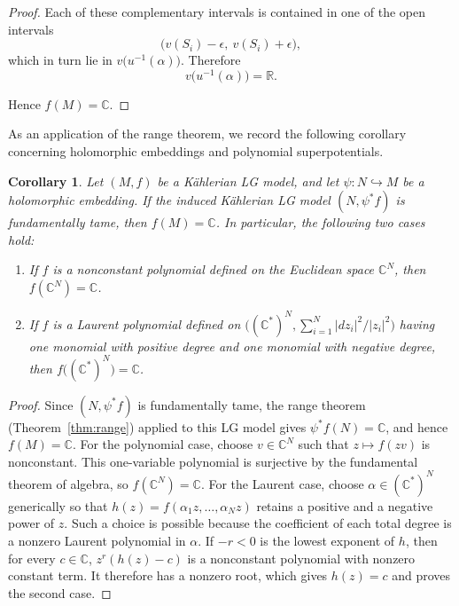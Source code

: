 \documentclass[11pt]{amsart}
\theoremstyle{plain}
\newtheorem{corollary}[theorem]{Corollary}
\theoremstyle{definition}
\theoremstyle{remark}
\numberwithin{equation}{section}
\begin{document}
\begin{proof}
    Each of these complementary intervals is contained in one of the open intervals
    \begin{equation}
        \bigl(v(S_i) - \epsilon, \ v(S_i) + \epsilon\bigr),
    \end{equation}
    which in turn lie in $v\bigl(u^{-1}(\alpha)\bigr)$.
    Therefore
    \begin{equation}
        v\bigl(u^{-1}(\alpha)\bigr) = \mathbb{R}.
    \end{equation}

    Hence $f(M) = \mathbb{C}$.
\end{proof}

As an application of the range theorem, we record the following corollary concerning holomorphic embeddings and polynomial superpotentials.

\begin{corollary}\label{cor:embedding}
    Let $(M,f)$ be a K\"ahlerian LG model, and let $\psi: N\hookrightarrow M$ be a holomorphic embedding.
    If the induced K\"ahlerian LG model $(N, \psi^* f)$ is fundamentally tame, then $f(M)=\mathbb{C}$.
    In particular, the following two cases hold:
    \begin{enumerate}
        \item If $f$ is a nonconstant polynomial defined on the Euclidean space $\mathbb{C}^N$, then $f(\mathbb{C}^N)=\mathbb{C}$.
        \item If $f$ is a Laurent polynomial defined on $\bigl((\mathbb{C}^*)^N, \sum_{i=1}^N |dz_i|^2/|z_i|^2\bigr)$ having one monomial with positive degree and one monomial with negative degree, then $f\bigl((\mathbb{C}^*)^N\bigr)=\mathbb{C}$.
    \end{enumerate}
\end{corollary}

\begin{proof}
    Since $(N, \psi^* f)$ is fundamentally tame, the range theorem (Theorem~\ref{thm:range}) applied to this LG model gives $\psi^*f(N)=\mathbb{C}$, and hence $f(M)=\mathbb{C}$.
    For the polynomial case, choose $v\in\mathbb{C}^N$ such that $z\mapsto f(zv)$ is nonconstant.
    This one-variable polynomial is surjective by the fundamental theorem of algebra, so $f(\mathbb{C}^N)=\mathbb{C}$.
    For the Laurent case, choose $\alpha\in(\mathbb{C}^*)^N$ generically so that $h(z)=f(\alpha_1z,\ldots,\alpha_Nz)$ retains a positive and a negative power of $z$.
    Such a choice is possible because the coefficient of each total degree is a nonzero Laurent polynomial in $\alpha$.
    If $-r<0$ is the lowest exponent of $h$, then for every $c\in\mathbb{C}$, $z^r(h(z)-c)$ is a nonconstant polynomial with nonzero constant term.
    It therefore has a nonzero root, which gives $h(z)=c$ and proves the second case.
\end{proof}
\end{document}
